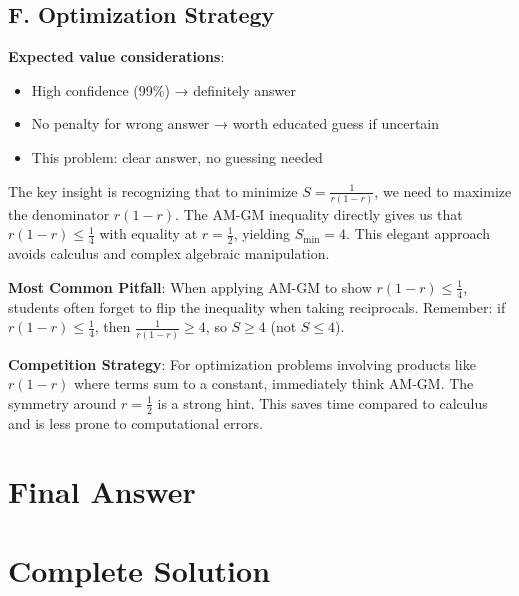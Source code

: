 \documentclass[12pt]{article}
\begin{document}
\begin{competitionbox}
\subsection*{F. Optimization Strategy}

\textbf{Expected value considerations}:
\begin{itemize}[leftmargin=*]
    \item High confidence (99\%) → definitely answer
    \item No penalty for wrong answer → worth educated guess if uncertain
    \item This problem: clear answer, no guessing needed
\end{itemize}
\end{competitionbox}

\begin{keyinsightbox}
The key insight is recognizing that to minimize $S = \frac{1}{r(1-r)}$, we need to maximize the denominator $r(1-r)$. The AM-GM inequality directly gives us that $r(1-r) \leq \frac{1}{4}$ with equality at $r = \frac{1}{2}$, yielding $S_{\min} = 4$. This elegant approach avoids calculus and complex algebraic manipulation.
\end{keyinsightbox}

\begin{warningbox}
\textbf{Most Common Pitfall}: When applying AM-GM to show $r(1-r) \leq \frac{1}{4}$, students often forget to flip the inequality when taking reciprocals. Remember: if $r(1-r) \leq \frac{1}{4}$, then $\frac{1}{r(1-r)} \geq 4$, so $S \geq 4$ (not $S \leq 4$).
\end{warningbox}

\begin{tipbox}
\textbf{Competition Strategy}: For optimization problems involving products like $r(1-r)$ where terms sum to a constant, immediately think AM-GM. The symmetry around $r = \frac{1}{2}$ is a strong hint. This saves time compared to calculus and is less prone to computational errors.
\end{tipbox}

\section*{Final Answer}

\section*{Complete Solution}
\end{document}

